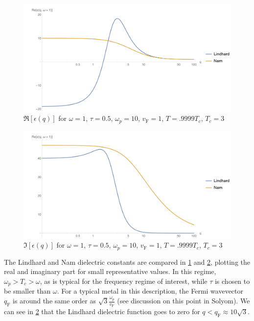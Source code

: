 \documentclass[%
 preprint,
 amsmath,amssymb,
 aps,
]{revtex4-2}
\newcommand{\vf}{v_{\mathrm{F}}}
\newcommand{\qf}{q_{\mathrm{F}}}
\begin{document}
\begin{figure}[htp]
	\centering
	\includegraphics[width=\linewidth]{Cond1Re}
	\caption{$\Re[\epsilon(q)]$ for $\omega = 1$, $\tau = 0.5$, $\omega_p = 10$, $\vf = 1$, $T = .9999 T_c$, $T_c = 3$} \label{fig:cond1Re}
\end{figure}

\begin{figure}[htp]
	\centering
	\includegraphics[width=\linewidth]{Cond1Im}
	\caption{$\Im[\epsilon(q)]$ for $\omega = 1$, $\tau = 0.5$, $\omega_p = 10$, $\vf = 1$, $T = .9999 T_c$, $T_c = 3$} \label{fig:cond1Im}
\end{figure}

The Lindhard and Nam dielectric constants are compared in \cref{fig:cond1Re} and \cref{fig:cond1Im}, plotting the real and imaginary part for small representative values.
In this regime, $\omega_p > T_c > \omega$, as is typical for the frequency regime of interest, while $\tau$ is chosen to be smaller than $\omega$.
For a typical metal in this description, the Fermi wavevector $\qf$ is around the same order as $\sqrt{3}\frac{\omega_p}{\vf}$ (see discussion on this point in Solyom\cite{SolyomV3}).
We can see in \cref{fig:cond1Im} that the Lindhard dielectric function goes to zero for $q < \qf \approx 10 \sqrt{3}$.
\end{document}
